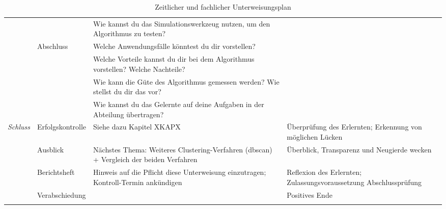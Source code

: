 \begin{longtable}[c]{@{}lp{3.5cm}p{4.5cm}p{4.0cm}@{}}
	\\* \cmidrule(lr){3-3}
	&
	&
	Wie kannst du das Simulationswerkzeug nutzen, um den Algorithmus zu testen? &
	\\* \cmidrule(lr){2-3}
	&
	\multirow{4}{*}{Abschluss} &
	Welche Anwendungsfälle könntest du dir vorstellen? &
	\\* \cmidrule(lr){3-3}
	&
	&
	Welche Vorteile kannst du dir bei dem Algorithmus vorstellen? Welche Nachteile? &
	\\* \cmidrule(lr){3-3}
	&
	&
	Wie kann die Güte des Algorithmus gemessen werden? Wie stellst du dir das vor? &
	\\* \cmidrule(lr){3-3}
	&
	&
	Wie kannst du das Gelernte auf deine Aufgaben in der Abteilung übertragen? &
	\\* \midrule
	\multirow{4}{*}{\textit{Schluss}} &
	Erfolgskontrolle &
	Siehe dazu Kapitel XKAPX &
	Überprüfung des Erlernten; Erkennung von möglichen Lücken \\* \cmidrule(l){2-4} 
	&
	Ausblick &
	Nächstes Thema: Weiteres Clustering-Verfahren (dbscan) + Vergleich der beiden Verfahren &
	Überblick, Transparenz und Neugierde wecken \\* \cmidrule(l){2-4} 
	&
	Berichtsheft &
	Hinweis auf die Pflicht diese Unterweisung einzutragen; Kontroll-Termin ankündigen &
	Reflexion des Erlernten; Zulassungsvoraussetzung Abschlussprüfung \\* \cmidrule(l){2-4} 
	&
	Verabschiedung &
	&
	Positives Ende \\* \bottomrule
	\caption{Zeitlicher und fachlicher Unterweisungsplan}
	\label{tab:Unterweisungsplan}\\
\end{longtable}